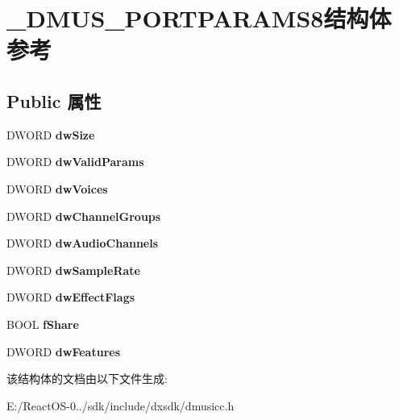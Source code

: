 \hypertarget{struct___d_m_u_s___p_o_r_t_p_a_r_a_m_s8}{}\section{\+\_\+\+D\+M\+U\+S\+\_\+\+P\+O\+R\+T\+P\+A\+R\+A\+M\+S8结构体 参考}
\label{struct___d_m_u_s___p_o_r_t_p_a_r_a_m_s8}
\subsection*{Public 属性}
\begin{DoxyCompactItemize}
\item 
\mbox{\label{struct___d_m_u_s___p_o_r_t_p_a_r_a_m_s8_a906b69b8033c6149dd90c6ee39251b07}} 
D\+W\+O\+RD {\bfseries dw\+Size}
\item 
\mbox{\label{struct___d_m_u_s___p_o_r_t_p_a_r_a_m_s8_a813c58cd46c1def78db149f704a7be15}} 
D\+W\+O\+RD {\bfseries dw\+Valid\+Params}
\item 
\mbox{\label{struct___d_m_u_s___p_o_r_t_p_a_r_a_m_s8_af194d222031954b521eb35b1af02716d}} 
D\+W\+O\+RD {\bfseries dw\+Voices}
\item 
\mbox{\label{struct___d_m_u_s___p_o_r_t_p_a_r_a_m_s8_ad5c5ee75ca4e43c28a402435d5c2080e}} 
D\+W\+O\+RD {\bfseries dw\+Channel\+Groups}
\item 
\mbox{\label{struct___d_m_u_s___p_o_r_t_p_a_r_a_m_s8_ac57068e0feafe668340569d808ac9364}} 
D\+W\+O\+RD {\bfseries dw\+Audio\+Channels}
\item 
\mbox{\label{struct___d_m_u_s___p_o_r_t_p_a_r_a_m_s8_a2e46935b1474967ca2b63c5c2d1e77fe}} 
D\+W\+O\+RD {\bfseries dw\+Sample\+Rate}
\item 
\mbox{\label{struct___d_m_u_s___p_o_r_t_p_a_r_a_m_s8_a2f04c22d807d17603621791a07962f9f}} 
D\+W\+O\+RD {\bfseries dw\+Effect\+Flags}
\item 
\mbox{\label{struct___d_m_u_s___p_o_r_t_p_a_r_a_m_s8_a44a705197cfcabc52ceea722576a9f7c}} 
B\+O\+OL {\bfseries f\+Share}
\item 
\mbox{\label{struct___d_m_u_s___p_o_r_t_p_a_r_a_m_s8_af881dc30343a79e6cb35d6d3bb2579a6}} 
D\+W\+O\+RD {\bfseries dw\+Features}
\end{DoxyCompactItemize}


该结构体的文档由以下文件生成\+:\begin{DoxyCompactItemize}
\item 
E\+:/\+React\+O\+S-\/0../sdk/include/dxsdk/dmusicc.\+h\end{DoxyCompactItemize}
